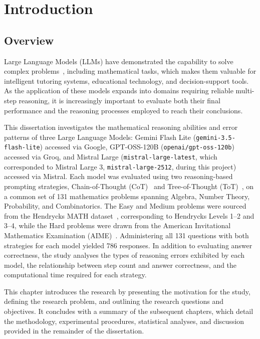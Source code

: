 \chapter{Introduction}
\label{chap:introduction}

\section{Overview}

Large Language Models (LLMs) have demonstrated the capability to solve
complex problems~\cite{brown2020fewshot, chowdhery2022palm}, including
mathematical tasks, which makes them valuable
for intelligent tutoring systems, educational technology, and
decision-support tools. As the application of these models expands into
domains requiring reliable multi-step reasoning, it is increasingly
important to evaluate both their final performance and the reasoning
processes employed to reach their conclusions.

This dissertation investigates the mathematical reasoning abilities and
error patterns of three Large Language Models: Gemini Flash Lite
(\texttt{gemini-3.5-flash-lite}) accessed via Google, GPT-OSS-120B
(\texttt{openai/gpt-oss-120b}) accessed via Groq, and Mistral Large
(\texttt{mistral-large-latest}, which corresponded to Mistral Large 3,
\texttt{mistral-large-2512}, during this project) accessed via Mistral.
Each model was evaluated using two reasoning-based prompting strategies,
Chain-of-Thought (CoT)~\cite{wei2022chain} and Tree-of-Thought
(ToT)~\cite{yao2023tree}, on a common set of 131 mathematics problems
spanning Algebra, Number Theory, Probability, and Combinatorics. The Easy
and Medium problems were sourced from the Hendrycks MATH
dataset~\cite{hendrycks2021measuring}, corresponding to Hendrycks Levels
1--2 and 3--4, while the Hard problems were drawn from the American
Invitational Mathematics Examination (AIME)~\cite{maa_aime}. Administering
all 131 questions with both strategies for each model yielded 786
responses. In addition to evaluating answer correctness, the study
analyses the types of reasoning errors exhibited by each model, the
relationship between step count and answer correctness, and the
computational time required for each strategy.

This chapter introduces the research by presenting the motivation for the
study, defining the research problem, and outlining the research questions
and objectives. It concludes with a summary of the subsequent chapters,
which detail the methodology, experimental procedures, statistical
analyses, and discussion provided in the remainder of the dissertation.

